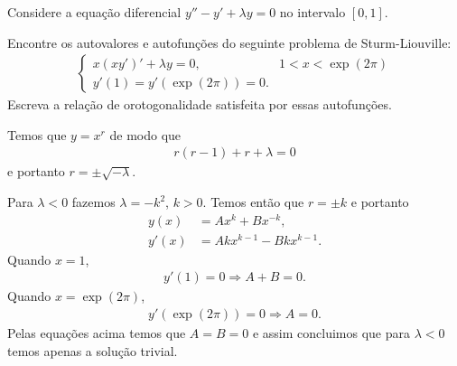 \documentclass[a4paper,12pt, leqno, answers]{exam}
\begin{document}
\begin{questions}
    \question Considere a equa\c{c}\~{a}o diferencial $y'' - y' + \lambda y = 0$ no intervalo $[0, 1]$.

    \question[P2 de 2011, E de 2011] Encontre os autovalores e autofun\c{c}\~{o}es do seguinte problema de Sturm-Liouville:
    \begin{align*}
        \begin{cases}
            x(x y')' + \lambda y = 0, & 1 < x < \exp(2\pi) \\
            y'(1) = y'(\exp(2\pi)) = 0.
        \end{cases}
    \end{align*}
    Escreva a rela\c{c}\~{a}o de orotogonalidade satisfeita por essas autofun\c{c}\~{o}es.
    \begin{solution}
        Temos que $y = x^r$ de modo que
        \begin{align*}
            r (r - 1) + r + \lambda = 0
        \end{align*}
        e portanto $ r = \pm \sqrt{- \lambda}$.

        Para $\lambda < 0$ fazemos $\lambda = - k^2$, $k > 0$. Temos ent\~{a}o que $r = \pm k$ e portanto
        \begin{align*}
            y(x) &= A x^k + B x^{-k}, \\
            y'(x) &= A k x^{k - 1} - B k x^{k - 1}.
        \end{align*}
        Quando $x = 1$,
        \begin{align*}
            y'(1) = 0 \Rightarrow A + B = 0.
        \end{align*}
        Quando $x = \exp(2\pi)$,
        \begin{align*}
            y'(\exp(2\pi)) = 0 \Rightarrow A = 0.
        \end{align*}
        Pelas equa\c{c}\~{o}es acima temos que $A = B = 0$ e assim concluimos que para $\lambda < 0$ temos apenas a solu\c{c}\~{a}o trivial.


\end{solution}
\end{questions}
\end{document}
